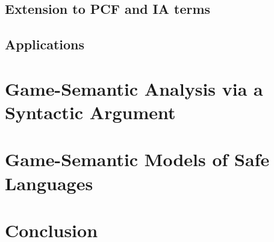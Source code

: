     \section{Extension to PCF and IA terms}
    


    \section{Applications}


\chapter{Game-Semantic Analysis via a Syntactic Argument}
    \label{chap:syntactic_gamesem}
    
    \clearpage
    


\chapter{Game-Semantic Models of Safe Languages}
    \label{chap:model}
    



\chapter{Conclusion}
    \label{chap:conclusion}
    





\printindex

     {\protect{}}



